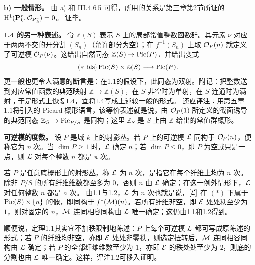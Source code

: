\medskip\noindent\textbf{b) 一般情形。}
由 a) 和 III.4.6.5 可得，所用的关系是第三章第2节所证的
\(\mathrm H^1(\mathbf P_k^r,\mathcal O_{\mathbf P_k^r})=0\)。
\hfill 证毕。

\medskip\noindent\textbf{1.4 的另一种表述。}
令 \(\mathbb Z(S)\) 表示 \(S\) 上的局部常值整数函数群。其元素 \(\nu\) 对应于两两不交的开分割 \((S_n)\)（允许部分为空）；在 \(f^{-1}(S_n)\) 上取 \(\mathcal O_P(n)\) 就定义了可逆模 \(\mathcal O_P(\nu)\)。这给出自然同态 \(\mathbb Z(S)\to\operatorname{Pic}(P)\)，并给出变式
\[
(*\mathrm{\ bis}) \operatorname{Pic}(S)\times\mathbb Z(S)\longrightarrow\operatorname{Pic}(P).
\]
更一般也更令人满意的断言是：在1.1的假设下，此同态为双射。附记：把整数送到对应常值函数的典范映射 \(\mathbb Z\to\mathbb Z(S)\)，在 \(S\) 非空时为单射，在 \(S\) 连通时为满射；于是形式上恢复1.4，宜将1.4写成上述较一般的形式。
还应评注：用第五章1.1将引入的 Picard 概形语言，该等价表述就是说，由 \(\mathcal O_P(1)\) 所定义的截面诱导的典范同态
\(\mathbb Z_S\to\operatorname{Pic}_{P/S}\)
是同构；这里 \(\mathbb Z_S\) 是 \(S\) 上由 \(\mathbb Z\) 给出的常值群概形。

\medskip\noindent\textbf{可逆模的度数。}
设 \(P\) 是域 \(k\) 上的射影丛。若 \(P\) 上的可逆模 \(\mathcal L\) 同构于 \(\mathcal O_P(n)\)，便称它为 \(n\) 次。当 \(\dim P\ge 1\) 时，\(\mathcal L\) 确定 \(n\)；若 \(\dim P\le 0\)，即 \(P\) 为空或只是一点，则 \(\mathcal L\) 对每个整数 \(n\) 都是 \(n\) 次。

若 \(P\) 是任意底概形上的射影丛，称 \(\mathcal L\) 为 \(n\) 次，是指它在每个纤维上均为 \(n\) 次。除非 \(P/S\) 的所有纤维维数都至多为 \(0\)，否则 \(n\) 由 \(\mathcal L\) 确定；在这一例外情形下，\(\mathcal L\) 对任何整数 \(n\) 都是 \(n\) 次。
由1.1与1.2，\(\mathcal L\) 为 \(n\) 次也就是说，\([\mathcal L]\) 在 \((*)\) 下属于 \(\operatorname{Pic}(S)\times\{n\}\) 的像，即同构于 \(f^*(\mathcal M)(n)\)。若所有纤维非空，即 \(\mathcal E\) 处处秩至少为 \(1\)，则对固定的 \(n\)，\(\mathcal M\) 连同相容同构由 \(\mathcal L\) 唯一确定；这仍由1.1和1.2得到。

顺便说，定理1.1其实宜不加秩限制地陈述：\(P\) 上每个可逆模 \(\mathcal L\) 都可写成原陈述的形式；若 \(P\) 的纤维均非空，亦即 \(\mathcal E\) 处处非零秩，则选定扭转后，\(\mathcal M\) 连同相容同构由 \(\mathcal L\) 确定；若 \(P\) 的全部纤维维数至少为 \(1\)，亦即 \(\mathcal E\) 的秩处处至少为 \(2\)，则底的分割也由 \(\mathcal L\) 唯一确定。这样，评注1.2可移入证明。

